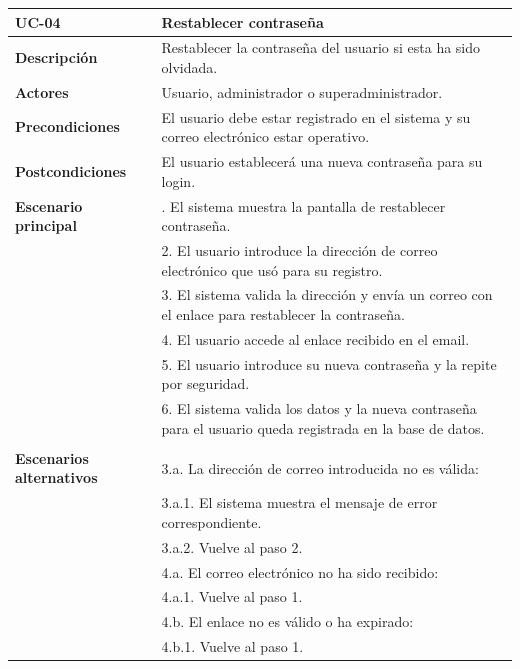 \begin{table}
  \begin{center}
    \begin{tabularx}{16.4cm}{|l|X|}
      \hline
      \textbf{UC-04} & \textbf{Restablecer contraseña}\\
      \hline
      \textbf{Descripción} & Restablecer la contraseña del usuario si esta ha sido olvidada.\\
      \hline
      \textbf{Actores} & Usuario, administrador o superadministrador.\\
      \hline
      \textbf{Precondiciones} & El usuario debe estar registrado en el sistema y su correo electrónico estar operativo.\\
      \hline
      \textbf{Postcondiciones} & El usuario establecerá una nueva contraseña para su login.\\
      \hline
      \textbf{Escenario principal} & \smallskip 1. El sistema muestra la pantalla de restablecer contraseña. \\
      & 2. El usuario introduce la dirección de correo electrónico que usó para su registro.\\
      & 3. El sistema valida la dirección y envía un correo con el enlace para restablecer la contraseña.\\
      & 4. El usuario accede al enlace recibido en el email.\\
      & 5. El usuario introduce su nueva contraseña y la repite por seguridad.\\
      & 6. El sistema valida los datos y la nueva contraseña para el usuario queda registrada en la base de datos.\\
      & \\
      \hline
      \textbf{Escenarios alternativos} & \smallskip  3.a. La dirección de correo introducida no es válida:\\
      & \hspace{0.3cm} 3.a.1. El sistema muestra el mensaje de error correspondiente.\\
      & \hspace{0.3cm} 3.a.2. Vuelve al paso 2.\\
      & 4.a. El correo electrónico no ha sido recibido:\\
      & \hspace{0.3cm} 4.a.1. Vuelve al paso 1.\\
      & 4.b. El enlace no es válido o ha expirado:\\
      & \hspace{0.3cm} 4.b.1. Vuelve al paso 1.\\

\end{tabularx}
\end{center}
\end{table}
